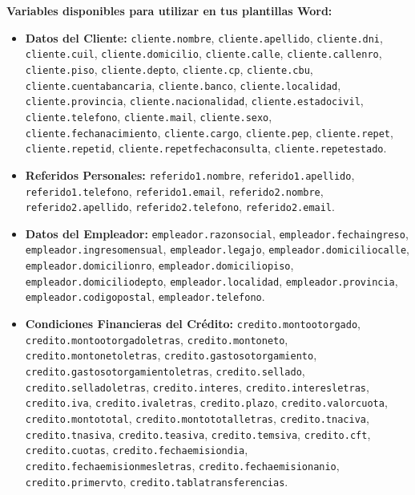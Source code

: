 \documentclass[12pt,a4paper]{article}
\renewcommand{\_}{\textunderscore\allowbreak}
\begin{document}
\textbf{Variables disponibles para utilizar en tus plantillas Word:}
\begin{itemize}\raggedright
    \item \textbf{Datos del Cliente:} \texttt{cliente.nombre}, \texttt{cliente.apellido}, \texttt{cliente.dni}, \texttt{cliente.cuil}, \texttt{cliente.domicilio}, \texttt{cliente.calle}, \texttt{cliente.calle\_nro}, \texttt{cliente.piso}, \texttt{cliente.depto}, \texttt{cliente.cp}, \texttt{cliente.cbu}, \texttt{cliente.cuenta\_bancaria}, \texttt{cliente.banco}, \texttt{cliente.localidad}, \texttt{cliente.provincia}, \texttt{cliente.nacionalidad}, \texttt{cliente.estado\_civil}, \texttt{cliente.telefono}, \texttt{cliente.mail}, \texttt{cliente.sexo}, \texttt{cliente.fecha\_nacimiento}, \texttt{cliente.cargo}, \texttt{cliente.pep}, \texttt{cliente.repet}, \texttt{cliente.repet\_id}, \texttt{cliente.repet\_fecha\_consulta}, \texttt{cliente.repet\_estado}.
    \item \textbf{Referidos Personales:} \texttt{referido\_1.nombre}, \texttt{referido\_1.apellido}, \texttt{referido\_1.telefono}, \texttt{referido\_1.email}, \texttt{referido\_2.nombre}, \texttt{referido\_2.apellido}, \texttt{referido\_2.telefono}, \texttt{referido\_2.email}.
    \item \textbf{Datos del Empleador:} \texttt{empleador.razon\_social}, \texttt{empleador.fecha\_ingreso}, \texttt{empleador.ingreso\_mensual}, \texttt{empleador.legajo}, \texttt{empleador.domicilio\_calle}, \texttt{empleador.domicilio\_nro}, \texttt{empleador.domicilio\_piso}, \texttt{empleador.domicilio\_depto}, \texttt{empleador.localidad}, \texttt{empleador.provincia}, \texttt{empleador.codigo\_postal}, \texttt{empleador.telefono}.
    \item \textbf{Condiciones Financieras del Crédito:} \texttt{credito.monto\_otorgado}, \texttt{credito.monto\_otorgado\_letras}, \texttt{credito.monto\_neto}, \texttt{credito.monto\_neto\_letras}, \texttt{credito.gastos\_otorgamiento}, \texttt{credito.gastos\_otorgamiento\_letras}, \texttt{credito.sellado}, \texttt{credito.sellado\_letras}, \texttt{credito.interes}, \texttt{credito.interes\_letras}, \texttt{credito.iva}, \texttt{credito.iva\_letras}, \texttt{credito.plazo}, \texttt{credito.valor\_cuota}, \texttt{credito.monto\_total}, \texttt{credito.monto\_total\_letras}, \texttt{credito.tna\_c\_iva}, \texttt{credito.tna\_s\_iva}, \texttt{credito.tea\_s\_iva}, \texttt{credito.tem\_s\_iva}, \texttt{credito.cft}, \texttt{credito.cuotas}, \texttt{credito.fecha\_emision\_dia}, \texttt{credito.fecha\_emision\_mes\_letras}, \texttt{credito.fecha\_emision\_anio}, \texttt{credito.primer\_vto}, \texttt{credito.tabla\_transferencias}.

\end{itemize}
\end{document}

